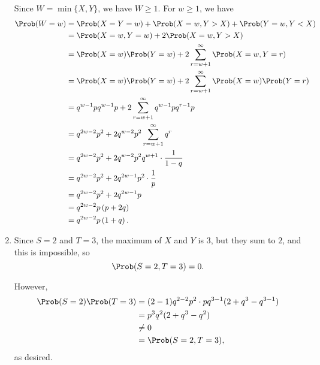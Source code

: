 \begin{enumerate}
          Since \(W = \min\{X, Y\}\), we have \(W \geq 1\). For \(w \geq 1\), we have
          \begin{align*}
              \Prob(W = w) & = \Prob(X = Y = w) + \Prob(X = w, Y > X) + \Prob(Y = w, Y < X)                      \\
                           & = \Prob(X = w, Y = w) + 2\Prob(X = w, Y > X)                                        \\
                           & = \Prob(X = w) \Prob(Y = w) + 2 \sum_{r = w + 1}^{\infty} \Prob(X = w, Y = r)       \\
                           & = \Prob(X = w) \Prob(Y = w) + 2 \sum_{r = w + 1}^{\infty} \Prob(X = w) \Prob(Y = r) \\
                           & = q^{w - 1} p q^{w - 1} p + 2 \sum_{r = w + 1}^{\infty} q^{w - 1} p q^{r - 1} p     \\
                           & = q^{2w - 2} p^2 + 2 q^{w - 2} p^2 \sum_{r = w + 1}^{\infty} q^r                    \\
                           & = q^{2w - 2} p^2 + 2 q^{w - 2} p^2 q^{w + 1} \cdot \frac{1}{1 - q}                  \\
                           & = q^{2w - 2} p^2 + 2 q^{2w - 1} p^2 \cdot \frac{1}{p}                               \\
                           & = q^{2w - 2} p^2 + 2 q^{2w - 1} p                                                   \\
                           & = q^{2w - 2} p \left(p + 2q\right)                                                  \\
                           & = q^{2w - 2} p \left(1 + q\right).
          \end{align*}

    \item Since \(S = 2\) and \(T = 3\), the maximum of \(X\) and \(Y\) is \(3\), but they sum to \(2\), and this is impossible, so
          \[
              \Prob(S = 2, T = 3) = 0.
          \]

          However,
          \begin{align*}
              \Prob(S = 2) \Prob(T = 3) & = (2 - 1) q^{2 - 2} p^2 \cdot p q^{3 - 1} (2 + q^3 - q^{3 - 1}) \\
                                        & = p^3 q^2 (2 + q^3 - q^2)                                       \\
                                        & \neq 0                                                          \\
                                        & = \Prob(S = 2, T = 3),
          \end{align*}
          as desired.


\end{enumerate}
